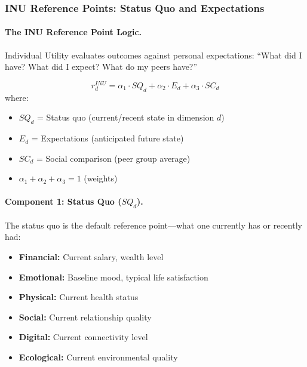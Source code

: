 \subsubsection{INU Reference Points: Status Quo and Expectations}

\paragraph{The INU Reference Point Logic.}
Individual Utility evaluates outcomes against personal expectations:
``What did I have? What did I expect? What do my peers have?''

\begin{definition}
\label{def:inu-reference}
\begin{equation}
r^{INU}_d = \alpha_1 \cdot SQ_d + \alpha_2 \cdot E_d + \alpha_3 \cdot SC_d
\end{equation}
where:
\begin{itemize}
\item $SQ_d$ = Status quo (current/recent state in dimension $d$)
\item $E_d$ = Expectations (anticipated future state)
\item $SC_d$ = Social comparison (peer group average)
\item $\alpha_1 + \alpha_2 + \alpha_3 = 1$ (weights)
\end{itemize}
\end{definition}

\paragraph{Component 1: Status Quo ($SQ_d$).}
The status quo is the default reference point---what one currently has or 
recently had:

\begin{itemize}
\item \textbf{Financial:} Current salary, wealth level
\item \textbf{Emotional:} Baseline mood, typical life satisfaction
\item \textbf{Physical:} Current health status
\item \textbf{Social:} Current relationship quality
\item \textbf{Digital:} Current connectivity level
\item \textbf{Ecological:} Current environmental quality
\end{itemize}

